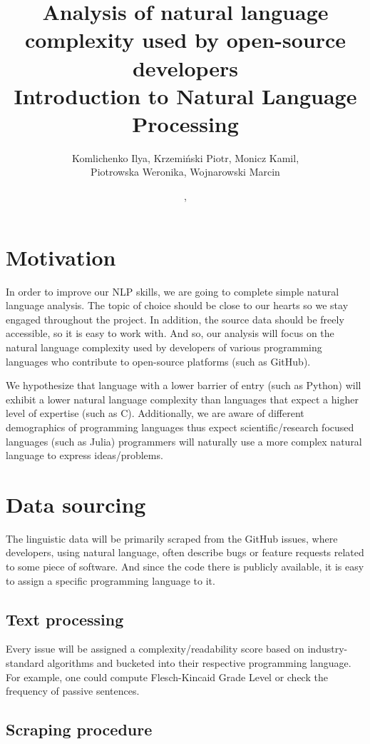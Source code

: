 \documentclass[]{article}
\title{Analysis of natural language complexity used by open-source developers\\ \large Introduction to Natural Language Processing}
\author{Komlichenko Ilya, Krzemiński Piotr, Monicz Kamil, \\Piotrowska Weronika, Wojnarowski Marcin}
\date{\monthname, \the\year}
\begin{document}
\maketitle

\tableofcontents
\newpage


\section{Motivation}

In order to improve our NLP skills, we are going to complete simple natural language analysis. The topic of choice should be close to our hearts so we stay engaged throughout the project. In addition, the source data should be freely accessible, so it is easy to work with. And so, our analysis will focus on the natural language complexity used by developers of various programming languages who contribute to open-source platforms (such as GitHub).

We hypothesize that language with a lower barrier of entry (such as Python) will exhibit a lower natural language complexity than languages that expect a higher level of expertise (such as C). Additionally, we are aware of different demographics of programming languages thus expect scientific/research focused languages (such as Julia) programmers will naturally use a more complex natural language to express ideas/problems.

\section{Data sourcing}

The linguistic data will be primarily scraped from the GitHub issues, where developers, using natural language, often describe bugs or feature requests related to some piece of software. And since the code there is publicly available, it is easy to assign a specific programming language to it.

\subsection{Text processing}

Every issue will be assigned a complexity/readability score based on industry-standard algorithms and bucketed into their respective programming language. For example, one could compute Flesch-Kincaid Grade Level or check the frequency of passive sentences.

\subsection{Scraping procedure}
\end{document}
